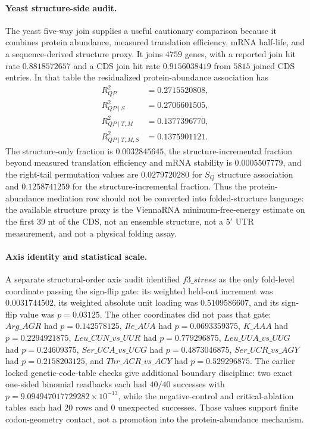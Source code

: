 \paragraph{Yeast structure-side audit.}
The yeast five-way join supplies a useful cautionary comparison because it combines protein abundance, measured translation efficiency, mRNA half-life, and a sequence-derived structure proxy.  It joins $4759$ genes, with a reported join hit rate $0.8818572657$ and a CDS join hit rate $0.9156038419$ from $5815$ joined CDS entries.  In that table the residualized protein-abundance association has
$$
\begin{aligned}
R^2_{QP}&=0.2715520808,\\
R^2_{QP\mid S}&=0.2706601505,\\
R^2_{QP\mid T,M}&=0.1377396770,\\
R^2_{QP\mid T,M,S}&=0.1375901121.
\end{aligned}
$$
The structure-only fraction is $0.0032845645$, the structure-incremental fraction beyond measured translation efficiency and mRNA stability is $0.0005507779$, and the right-tail permutation values are $0.0279720280$ for $S_Q$ structure association and $0.1258741259$ for the structure-incremental fraction.  Thus the protein-abundance mediation row should not be converted into folded-structure language: the available structure proxy is the ViennaRNA minimum-free-energy estimate on the first $39$ nt of the CDS, not an ensemble structure, not a $5'$ UTR measurement, and not a physical folding assay.

\paragraph{Axis identity and statistical scale.}
A separate structural-order axis audit identified $f3\_stress$ as the only fold-level coordinate passing the sign-flip gate: its weighted held-out increment was $0.0031744502$, its weighted absolute unit loading was $0.5109586607$, and its sign-flip value was $p=0.03125$.  The other coordinates did not pass that gate: $Arg\_AGR$ had $p=0.142578125$, $Ile\_AUA$ had $p=0.0693359375$, $K\_AAA$ had $p=0.2294921875$, $Leu\_CUN\_vs\_UUR$ had $p=0.779296875$, $Leu\_UUA\_vs\_UUG$ had $p=0.24609375$, $Ser\_UCA\_vs\_UCG$ had $p=0.4873046875$, $Ser\_UCR\_vs\_AGY$ had $p=0.2158203125$, and $Thr\_ACR\_vs\_ACY$ had $p=0.529296875$.  The earlier locked genetic-code-table checks give additional boundary discipline: two exact one-sided binomial readbacks each had $40/40$ successes with $p=9.094947017729282\times 10^{-13}$, while the negative-control and critical-ablation tables each had $20$ rows and $0$ unexpected successes.  Those values support finite codon-geometry contact, not a promotion into the protein-abundance mechanism.

